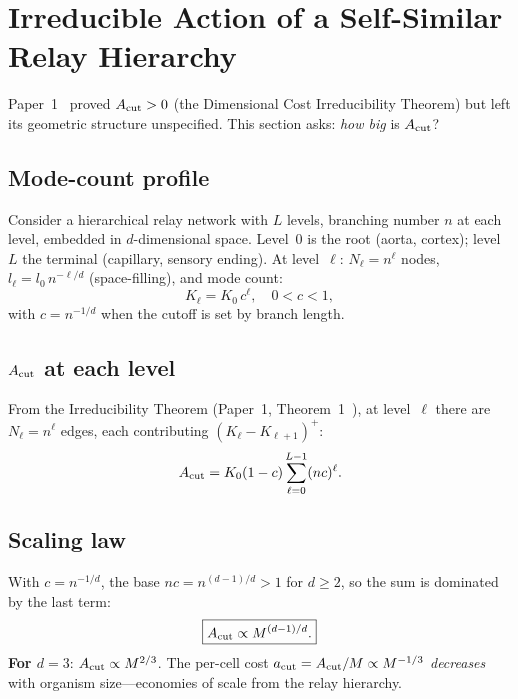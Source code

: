 \documentclass[aps,pre,twocolumn,superscriptaddress,floatfix]{revtex4-2}
\begin{document}
\section{Irreducible Action of a Self-Similar Relay Hierarchy}
\label{sec:fractal-cost}

Paper~1~\cite{Paper1} proved $A_{\text{cut}} > 0$ (the
Dimensional Cost Irreducibility Theorem) but left its
geometric structure unspecified.
This section asks: \emph{how big} is $A_{\text{cut}}$?

\subsection{Mode-count profile}

Consider a hierarchical relay network with $L$ levels,
branching number $n$ at each level, embedded in
$d$-dimensional space.
Level~0 is the root (aorta, cortex); level~$L$ the
terminal (capillary, sensory ending).
At level~$\ell$: $N_\ell = n^\ell$ nodes,
$l_\ell = l_0\,n^{-\ell/d}$ (space-filling), and
mode count:
\begin{equation}
  K_\ell = K_0\,c^\ell, \quad 0 < c < 1,
  \label{eq:mode-profile}
\end{equation}
with $c = n^{-1/d}$ when the cutoff is set by branch
length.

\subsection{$A_{\text{cut}}$ at each level}

From the Irreducibility Theorem (Paper~1,
Theorem~1~\cite{Paper1}), at level~$\ell$ there are
$N_\ell = n^\ell$ edges, each contributing
$(K_\ell - K_{\ell+1})^+$:
\begin{equation}
  A_{\text{cut}} = K_0(1 - c) \sum_{\ell=0}^{L-1} (nc)^\ell.
  \label{eq:acut-sum}
\end{equation}

\subsection{Scaling law}

With $c = n^{-1/d}$, the base $nc = n^{(d-1)/d} > 1$
for $d \ge 2$, so the sum is dominated by the last
term:
\begin{equation}
  \boxed{A_{\text{cut}} \propto M^{(d-1)/d}.}
  \label{eq:acut-mass}
\end{equation}
\textbf{For $d = 3$}: $A_{\text{cut}} \propto M^{2/3}$.
The per-cell cost $a_{\text{cut}} = A_{\text{cut}}/M \propto
M^{-1/3}$ \emph{decreases} with organism size---economies
of scale from the relay hierarchy.
\end{document}
